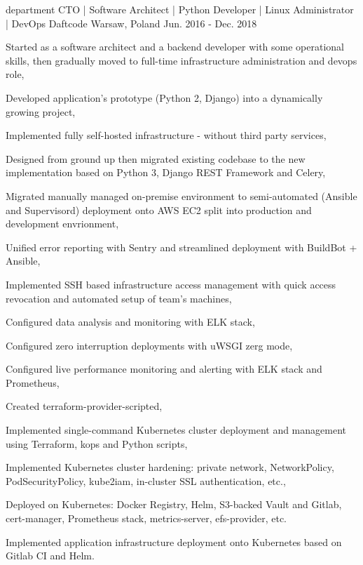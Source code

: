 \begin{cventries}
  \cventry
  {department CTO | Software Architect | Python Developer | Linux Administrator | DevOps} %
  {Daftcode} %
  {Warsaw, Poland} %
  {Jun. 2016 - Dec. 2018} %
  {
    \begin{cvitems} %
      \item {Started as a software architect and a backend developer with some operational skills, then gradually moved to full-time infrastructure administration and devops role,}
      \item {Developed application's prototype (Python 2, Django) into a dynamically growing project,}
      \item {Implemented fully self-hosted infrastructure - without third party services,}
      \item {Designed from ground up then migrated existing codebase to the new implementation based on Python 3, Django REST Framework and Celery,}
      \item {Migrated manually managed on-premise environment to semi-automated (Ansible and Supervisord) deployment onto AWS EC2 split into production and development envrionment,}
      \item {Unified error reporting with Sentry and streamlined deployment with BuildBot + Ansible,}
      \item {Implemented SSH based infrastructure access management with quick access revocation and automated setup of team's machines,}
      \item {Configured data analysis and monitoring with ELK stack,}
      \item {Configured zero interruption deployments with uWSGI zerg mode,}
      \item {Configured live performance monitoring and alerting with ELK stack and Prometheus,}
      \item {Created terraform-provider-scripted,}
      \item {Implemented single-command Kubernetes cluster deployment and management using Terraform, kops and Python scripts,}
      \item {Implemented Kubernetes cluster hardening: private network, NetworkPolicy, PodSecurityPolicy, kube2iam, in-cluster SSL authentication, etc.,}
      \item {Deployed on Kubernetes: Docker Registry, Helm, S3-backed Vault and Gitlab, cert-manager, Prometheus stack, metrics-server, efs-provider, etc.}
      \item {Implemented application infrastructure deployment onto Kubernetes based on Gitlab CI and Helm.}
    \end{cvitems}
  }


\end{cventries}
